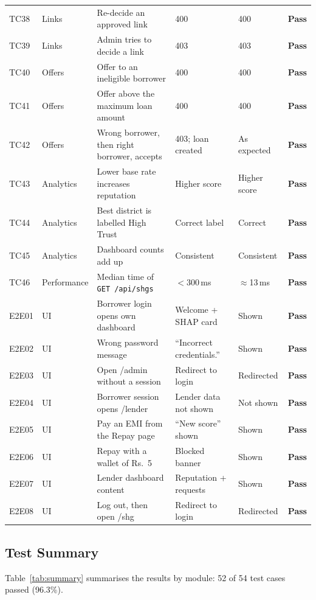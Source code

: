 \documentclass[11pt,a4paper]{article}
\newcommand{\code}[1]{\texttt{\small #1}}
\newcommand{\pass}{\textbf{Pass}}
\begin{document}
\begin{longtable}{@{}lL{1.95cm}L{4.3cm}L{2.9cm}L{2.5cm}l@{}}
TC38 & Links & Re-decide an approved link & 400 & 400 & \pass\\
TC39 & Links & Admin tries to decide a link & 403 & 403 & \pass\\
TC40 & Offers & Offer to an ineligible borrower & 400 & 400 & \pass\\
TC41 & Offers & Offer above the maximum loan amount & 400 & 400 & \pass\\
TC42 & Offers & Wrong borrower, then right borrower, accepts & 403; loan created & As expected & \pass\\
TC43 & Analytics & Lower base rate increases reputation & Higher score & Higher score & \pass\\
TC44 & Analytics & Best district is labelled High Trust & Correct label & Correct & \pass\\
TC45 & Analytics & Dashboard counts add up & Consistent & Consistent & \pass\\
TC46 & Performance & Median time of \code{GET /api/shgs} & $<300$\,ms & $\approx$13\,ms & \pass\\
E2E01 & UI & Borrower login opens own dashboard & Welcome + SHAP card & Shown & \pass\\
E2E02 & UI & Wrong password message & ``Incorrect credentials.'' & Shown & \pass\\
E2E03 & UI & Open /admin without a session & Redirect to login & Redirected & \pass\\
E2E04 & UI & Borrower session opens /lender & Lender data not shown & Not shown & \pass\\
E2E05 & UI & Pay an EMI from the Repay page & ``New score'' shown & Shown & \pass\\
E2E06 & UI & Repay with a wallet of Rs.~5 & Blocked banner & Shown & \pass\\
E2E07 & UI & Lender dashboard content & Reputation + requests & Shown & \pass\\
E2E08 & UI & Log out, then open /shg & Redirect to login & Redirected & \pass\\
\end{longtable}
\normalsize

\subsection{Test Summary}
Table~\ref{tab:summary} summarises the results by module: 52 of 54 test
cases passed (96.3\%).
\end{document}
